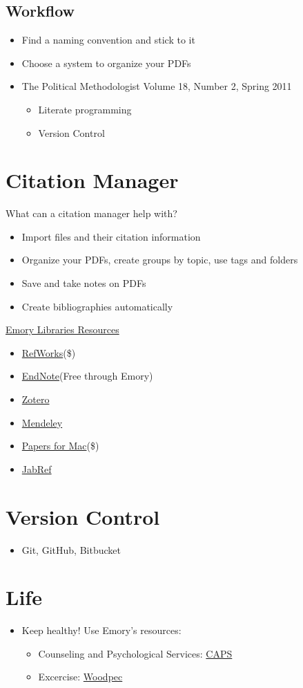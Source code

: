 \documentclass[11pt]{article}
\begin{document}
\subsection*{Workflow}
\begin{itemize}
  \item Find a naming convention and stick to it
  \item Choose a system to organize your PDFs
  \item The Political Methodologist Volume 18, Number 2, Spring 2011
  \begin{itemize}
    \item Literate programming
    \item Version Control
  \end{itemize}
\end{itemize}

\section*{Citation Manager}
What can a citation manager help with?
\begin{itemize}
  \item Import files and their citation information
  \item Organize your PDFs, create groups by topic, use tags and folders
  \item Save and take notes on PDFs
  \item Create bibliographies automatically
\end{itemize}
\href{https://guides.libraries.emory.edu/c.php?g=50756&p=325883}{Emory Libraries Resources}
\begin{itemize}
  \item \href{https://www.refworks.com}{RefWorks}(\$)
  \item \href{https://guides.libraries.emory.edu/main/endnote}{EndNote}(Free through Emory)
  \item \href{https://www.zotero.org/}{Zotero}
  \item \href{https://www.mendeley.com/}{Mendeley}
  \item \href{https://www.papersapp.com/}{Papers for Mac}(\$)
  \item \href{http://www.jabref.org/}{JabRef}
\end{itemize}

\section*{Version Control}
\begin{itemize}
  \item Git, GitHub, Bitbucket
\end{itemize}
\section*{Life}
\begin{itemize}
  \item Keep healthy! Use Emory's resources:
  \begin{itemize}
    \item Counseling and Psychological Services: \href{http://counseling.emory.edu/}{CAPS}
    \item Excercise: \href{http://play.emory.edu/}{Woodpec}
  \end{itemize}
\end{itemize}
\end{document}
